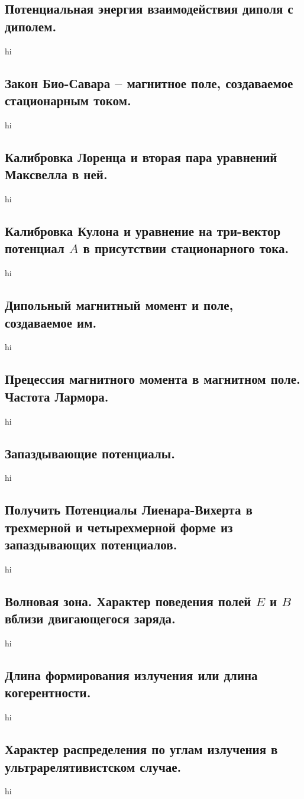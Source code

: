 \documentclass[a4paper,12pt]{article}
\begin{document}
\subsection{Потенциальная энергия взаимодействия диполя с диполем.}
hi
\subsection{Закон Био-Савара – магнитное поле, создаваемое стационарным током.}
hi
\subsection{Калибровка Лоренца и вторая пара уравнений Максвелла в ней.}
hi
\subsection{Калибровка Кулона и уравнение на три-вектор потенциал $A$ в
присутствии стационарного тока.}
hi
\subsection{Дипольный магнитный момент и поле, создаваемое им.}
hi
\subsection{Прецессия магнитного момента в магнитном поле. Частота Лармора.}
hi
\subsection{Запаздывающие потенциалы.}
hi
\subsection{Получить Потенциалы Лиенара-Вихерта в трехмерной и четырехмерной
форме из запаздывающих потенциалов.}
hi
\subsection{Волновая зона. Характер поведения полей $E$ и $B$ вблизи
двигающегося заряда.}
hi
\subsection{Длина формирования излучения или длина когерентности.}
hi
\subsection{Характер распределения по углам излучения в ультрарелятивистском
случае.}
hi
\end{document}
